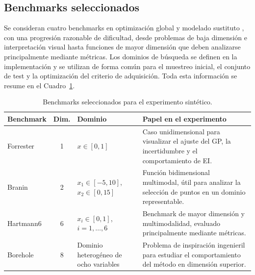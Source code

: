 \subsection{Benchmarks seleccionados}
\label{subsubsec:benchmarks_seleccionados}

Se consideran cuatro benchmarks en optimización global y modelado sustituto \cite{surjanovic_bingham_testfunctions,forrester2008engineering,dixon1978global,morris1993bayesian}, con una progresión razonable de dificultad, desde problemas de baja dimensión e interpretación visual hasta funciones de mayor dimensión que deben analizarse principalmente mediante métricas. Los dominios de búsqueda se definen en la implementación y se utilizan de forma común para el muestreo inicial, el conjunto de test y la optimización del criterio de adquisición. Toda esta información se resume en el Cuadro~\ref{tab:benchmarks_seleccionados}.

\begin{table}[htbp]
    \centering
    \small
    \caption[Benchmarks del experimento sintético]{Benchmarks seleccionados para el experimento sintético.}
    \label{tab:benchmarks_seleccionados}
    \renewcommand{\arraystretch}{1.15}
    \setlength{\tabcolsep}{5pt}
    \begin{tabularx}{\textwidth}{@{}p{2.4cm} c p{3.8cm} X@{}}
        \toprule
        \textbf{Benchmark} & \textbf{Dim.} & \textbf{Dominio} & \textbf{Papel en el experimento} \\
        \midrule

        Forrester 
        & 1 
        & \(x \in [0,1]\)
        & Caso unidimensional para visualizar el ajuste del GP, la incertidumbre y el comportamiento de EI. \\

        Branin 
        & 2 
        & \(x_1 \in [-5,10]\), \(x_2 \in [0,15]\)
        & Función bidimensional multimodal, útil para analizar la selección de puntos en un dominio representable. \\

        Hartmann6 
        & 6 
        & \(x_i \in [0,1]\), \(i=1,\dots,6\)
        & Benchmark de mayor dimensión y multimodalidad, evaluado principalmente mediante métricas. \\

        Borehole 
        & 8 
        & Dominio heterogéneo de ocho variables
        & Problema de inspiración ingenieril para estudiar el comportamiento del método en dimensión superior. \\

        \bottomrule
    \end{tabularx}
\end{table}
\FloatBarrier

